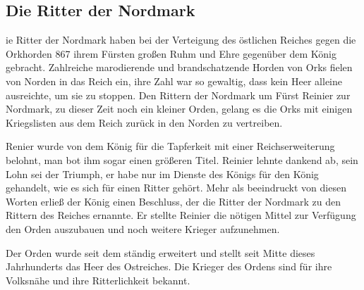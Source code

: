 \subsection{Die Ritter der Nordmark}
ie Ritter der Nordmark haben bei der Verteigung des östlichen
Reiches gegen die Orkhorden 867 ihrem Fürsten großen Ruhm und Ehre
gegenüber dem König gebracht. Zahlreiche marodierende und
brandschatzende Horden von Orks fielen von Norden in das Reich ein,
ihre Zahl war so gewaltig, dass kein Heer alleine ausreichte, um sie
zu stoppen. Den Rittern der Nordmark um Fürst Reinier zur Nordmark,
zu dieser Zeit noch ein kleiner Orden, gelang es die Orks mit
einigen Kriegslisten aus dem Reich zurück in den Norden zu
vertreiben.
\par Renier wurde von dem König für die Tapferkeit mit
einer Reichserweiterung belohnt, man bot ihm sogar einen größeren
Titel. Reinier lehnte dankend ab, sein Lohn sei der Triumph, er habe
nur im Dienste des Königs für den König gehandelt, wie es sich für
einen Ritter gehört. Mehr als beeindruckt von diesen Worten erließ
der König einen Beschluss, der die Ritter der Nordmark zu den
Rittern des Reiches ernannte. Er stellte Reinier die nötigen Mittel
zur Verfügung den Orden auszubauen und noch weitere Krieger
aufzunehmen.
\par Der Orden wurde seit dem ständig erweitert und stellt seit
Mitte dieses Jahrhunderts das Heer des Ostreiches. Die Krieger des
Ordens sind für ihre Volksnähe und ihre Ritterlichkeit bekannt.
